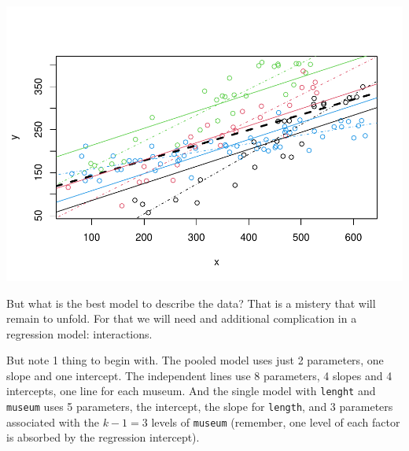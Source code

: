 \documentclass[
]{book}
\newenvironment{Shaded}{\begin{snugshade}}{\end{snugshade}}
\newcommand{\AttributeTok}[1]{\textcolor[rgb]{0.77,0.63,0.00}{#1}}
\newcommand{\DecValTok}[1]{\textcolor[rgb]{0.00,0.00,0.81}{#1}}
\newcommand{\FunctionTok}[1]{\textcolor[rgb]{0.00,0.00,0.00}{#1}}
\newcommand{\NormalTok}[1]{#1}
\newcommand{\SpecialCharTok}[1]{\textcolor[rgb]{0.00,0.00,0.00}{#1}}
\begin{document}
\begin{Shaded}
\end{Shaded}

\includegraphics{ECOMODbook_files/figure-latex/a7.16-1.pdf}

But what is the best model to describe the data? That is a mistery that will remain to unfold. For that we will need and additional complication in a regression model: interactions.

But note 1 thing to begin with. The pooled model uses just 2 parameters, one slope and one intercept. The independent lines use 8 parameters, 4 slopes and 4 intercepts, one line for each museum. And the single model with \texttt{lenght} and \texttt{museum} uses 5 parameters, the intercept, the slope for \texttt{length}, and 3 parameters associated with the \(k-1=3\) levels of \texttt{museum} (remember, one level of each factor is absorbed by the regression intercept).
\end{document}
